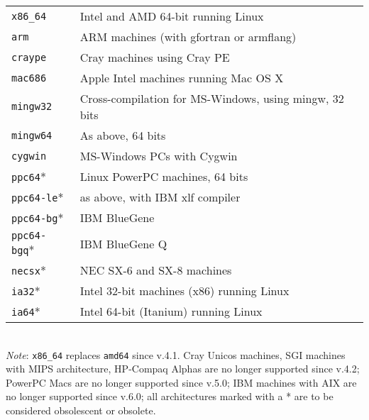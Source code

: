 \documentclass[12pt,a4paper]{article}
\begin{document}
\begin{tabular}{ll}
\texttt{x86\_64}   & Intel and AMD 64-bit running Linux\\
\texttt{arm}       & ARM machines (with gfortran or armflang)\\
\texttt{craype}    & Cray machines using Cray PE\\
\texttt{mac686}    & Apple Intel machines running Mac OS X\\
\texttt{mingw32}   & Cross-compilation for MS-Windows, using mingw, 32 bits\\
\texttt{mingw64}   & As above, 64 bits\\
\texttt{cygwin}    & MS-Windows PCs with Cygwin\\
\texttt{ppc64}*    & Linux PowerPC machines, 64 bits\\
\texttt{ppc64-le}* & as above, with IBM xlf compiler\\
\texttt{ppc64-bg}* & IBM BlueGene\\
\texttt{ppc64-bgq}*& IBM BlueGene Q\\
\texttt{necsx}*    & NEC SX-6 and SX-8 machines\\
\texttt{ia32}*     & Intel 32-bit machines (x86) running Linux\\
\texttt{ia64}*     & Intel 64-bit (Itanium) running Linux
\end{tabular}\\

{\em Note}: \texttt{x86\_64} replaces \texttt{amd64} since v.4.1.
Cray Unicos machines, SGI machines with MIPS architecture, HP-Compaq Alphas
are no longer supported since v.4.2; PowerPC Macs are no longer
supported since v.5.0; IBM machines with AIX are no longer supported
since v.6.0; all architectures marked with a * are to be considered
obsolescent or obsolete.
\end{document}
